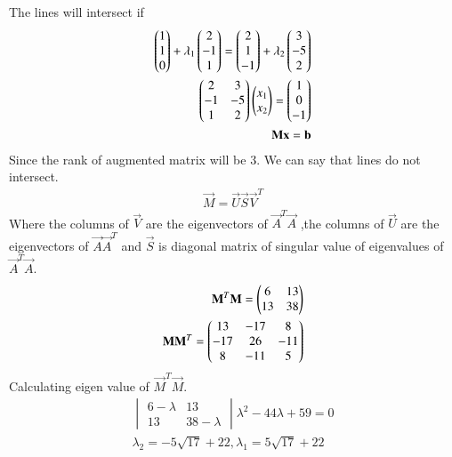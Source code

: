 
The lines will intersect if
\begin{align}
\begin{pmatrix}1\\1\\0\end{pmatrix}+\lambda_1\begin{pmatrix}2\\-1\\1\end{pmatrix}=\begin{pmatrix}2\\1\\-1\end{pmatrix}+\lambda_2\begin{pmatrix}3\\-5\\2\end{pmatrix}\\
\begin{pmatrix}2&3\\-1&-5\\1&2\end{pmatrix}\begin{pmatrix}x_1\\x_2\end{pmatrix}=\begin{pmatrix}1\\0\\-1\end{pmatrix}\\
\mathbf{M}\mathbf{x}=\mathbf{b}
\end{align}
Since the rank of augmented matrix will be 3. We can say that lines do not intersect.
\begin{align}
\vec{M}=\vec{U}\vec{S}\vec{V}^T\label{eq:solutions/3/1/2.0.4}
\end{align}
Where the columns of $\vec{V}$ are the eigenvectors of $\vec{A}^T\vec{A}$ ,the columns of $\vec{U}$ are the eigenvectors of $\vec{A}\vec{A}^T$ and $\vec{S}$ is diagonal matrix of singular value of eigenvalues of $\vec{A}^T\vec{A}$.
\begin{align}
\mathbf{M}^T\mathbf{M}=\begin{pmatrix}6&13\\13&38\end{pmatrix}\label{eq:solutions/3/1/2.0.6}\\
\mathbf{M}\mathbf{M}^T=\begin{pmatrix}13&-17&8\\-17&26&-11\\8&-11&5\end{pmatrix}
\end{align}
Calculating eigen value of $\vec{M}^T\vec{M}$.
\begin{align}
\begin{vmatrix}
6-\lambda&13\\13&38-\lambda
\end{vmatrix}
\lambda^2-44\lambda+59=0\\
\lambda_2=-5\sqrt{17}+22,\lambda_1=5\sqrt{17}+22
\end{align}

